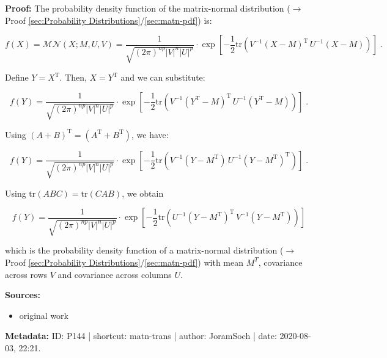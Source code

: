 \documentclass[a4paper,12pt,twoside]{book}
\begin{document}
\vspace{1em}
\textbf{Proof:} The probability density function of the matrix-normal distribution ($\rightarrow$ Proof \ref{sec:Probability Distributions}/\ref{sec:matn-pdf}) is:

\begin{equation} \label{eq:matn-trans-matn-pdf-X}
f(X) = \mathcal{MN}(X; M, U, V) = \frac{1}{\sqrt{(2\pi)^{np} |V|^n |U|^p}} \cdot \exp\left[-\frac{1}{2} \mathrm{tr}\left( V^{-1} (X-M)^\mathrm{T} \, U^{-1} (X-M) \right) \right] \; .
\end{equation}

Define $Y = X^\mathrm{T}$. Then, $X = Y^\mathrm{T}$ and we can substitute:

\begin{equation} \label{eq:matn-trans-matn-pdf-Y-s1}
f(Y) = \frac{1}{\sqrt{(2\pi)^{np} |V|^n |U|^p}} \cdot \exp\left[-\frac{1}{2} \mathrm{tr}\left( V^{-1} (Y^\mathrm{T}-M)^\mathrm{T} \, U^{-1} (Y^\mathrm{T}-M) \right) \right] \; .
\end{equation}

Using $(A+B)^\mathrm{T} = (A^\mathrm{T} + B^\mathrm{T})$, we have:

\begin{equation} \label{eq:matn-trans-matn-pdf-Y-s2}
f(Y) = \frac{1}{\sqrt{(2\pi)^{np} |V|^n |U|^p}} \cdot \exp\left[-\frac{1}{2} \mathrm{tr}\left( V^{-1} (Y-M^\mathrm{T}) \, U^{-1} (Y-M^\mathrm{T})^\mathrm{T} \right) \right] \; .
\end{equation}

Using $\mathrm{tr}(ABC) = \mathrm{tr}(CAB)$, we obtain

\begin{equation} \label{eq:matn-trans-matn-pdf-Y-s3}
f(Y) = \frac{1}{\sqrt{(2\pi)^{np} |V|^n |U|^p}} \cdot \exp\left[-\frac{1}{2} \mathrm{tr}\left( U^{-1} (Y-M^\mathrm{T})^\mathrm{T} \, V^{-1} (Y-M^\mathrm{T}) \right) \right]
\end{equation}

which is the probability density function of a matrix-normal distribution ($\rightarrow$ Proof \ref{sec:Probability Distributions}/\ref{sec:matn-pdf}) with mean $M^T$, covariance across rows $V$ and covariance across columns $U$.


\vspace{1em}
\textbf{Sources:}
\begin{itemize}
\item original work\end{itemize}


\vspace{1em}
\textbf{Metadata:} ID: P144 | shortcut: matn-trans | author: JoramSoch | date: 2020-08-03, 22:21.
\vspace{1em}
\end{document}
